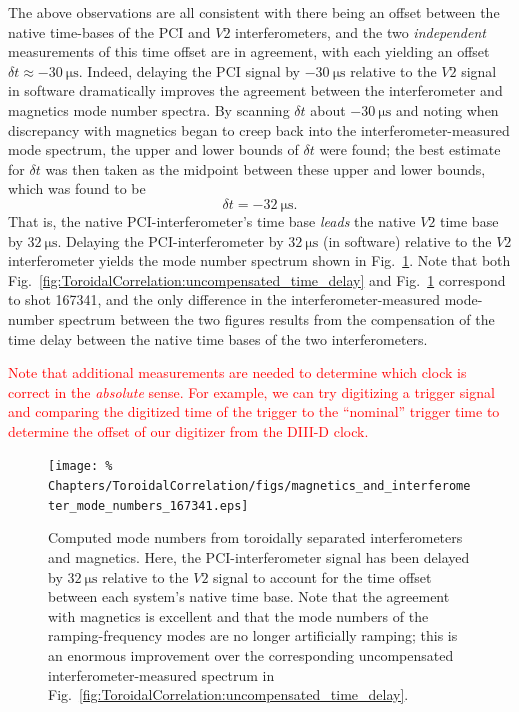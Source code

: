 The above observations are all consistent with there being an offset
between the native time-bases of the PCI and $V2$ interferometers, and
the two \emph{independent} measurements of this time offset are in agreement,
with each yielding an offset $\delta t \approx \SI{-30}{\micro\second}$.
Indeed, delaying the PCI signal by $-\SI{30}{\micro\second}$
relative to the $V2$ signal in software dramatically improves
the agreement between the interferometer and magnetics mode number spectra.
By scanning $\delta t$ about $-\SI{30}{\micro\second}$ and
noting when discrepancy with magnetics began to creep back into
the interferometer-measured mode spectrum,
the upper and lower bounds of $\delta t$ were found;
the best estimate for $\delta t$ was then taken as the midpoint
between these upper and lower bounds, which was found to be
\begin{equation}
  \delta t = -\SI{32}{\micro\second}.
  \label{eq:ToroidalCorrelation:time_delay}
\end{equation}
That is, the native PCI-interferometer's time base \emph{leads}
the native $V2$ time base by $\SI{32}{\micro\second}$.
Delaying the PCI-interferometer by $\SI{32}{\micro\second}$ (in software)
relative to the $V2$ interferometer yields the mode number spectrum
shown in Fig.~\ref{fig:ToroidalCorrelation:compensated_time_delay}.
Note that both
Fig.~\ref{fig:ToroidalCorrelation:uncompensated_time_delay} and
Fig.~\ref{fig:ToroidalCorrelation:compensated_time_delay}
correspond to shot 167341, and
the only difference in the interferometer-measured mode-number spectrum
between the two figures results from the compensation of the time delay
between the native time bases of the two interferometers.

\textcolor{red}{Note that additional measurements are needed
to determine which clock is correct in the \emph{absolute} sense.
For example, we can try digitizing a trigger signal and
comparing the digitized time of the trigger to the ``nominal'' trigger time
to determine the offset of our digitizer from the DIII-D clock.}

\begin{figure}
  \centering
  \texttt{[image: \%
    Chapters/ToroidalCorrelation/figs/magnetics\_and\_interferometer\_mode\_numbers\_167341.eps]}
  \caption[Computed toroidal mode numbers \emph{after} removing time delay
      from Fig.~\ref{fig:ToroidalCorrelation:uncompensated_time_delay}]{%
    Computed mode numbers from
    toroidally separated interferometers and magnetics.
    Here, the PCI-interferometer signal has been delayed by
    $\SI{32}{\micro\second}$ relative to the $V2$ signal
    to account for the time offset between each system's native time base.
    Note that the agreement with magnetics is excellent and that
    the mode numbers of the ramping-frequency modes are no longer
    artificially ramping;
    this is an enormous improvement over the corresponding
    uncompensated interferometer-measured spectrum in
    Fig.~\ref{fig:ToroidalCorrelation:uncompensated_time_delay}.}
\label{fig:ToroidalCorrelation:compensated_time_delay}
\end{figure}


